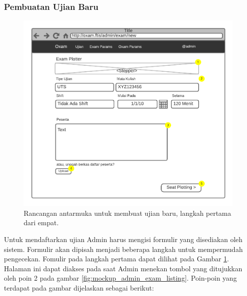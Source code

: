 \subsubsection{Pembuatan Ujian Baru}
    \begin{figure}
        \centering
        \includegraphics{Gambar/mockups/Mockup--Admin - NewExam-Step 1.pdf}
        \caption{Rancangan antarmuka untuk membuat ujian baru, langkah pertama dari empat.}
        \label{fig:mockup_admin_exam_create-1}
    \end{figure}
    Untuk mendaftarkan ujian Admin harus mengisi formulir yang disediakan oleh sistem. Formulir akan
    dipisah menjadi beberapa langkah untuk mempermudah pengecekan. Fomulir pada langkah pertama dapat
    dilihat pada Gambar \ref{fig:mockup_admin_exam_create-1}. Halaman ini dapat diakses pada saat Admin
    menekan tombol yang ditujukkan oleh poin 2 pada gambar \ref{fig:mockup_admin_exam_listing}.
    Poin-poin yang terdapat pada gambar dijelaskan sebagai berikut:
